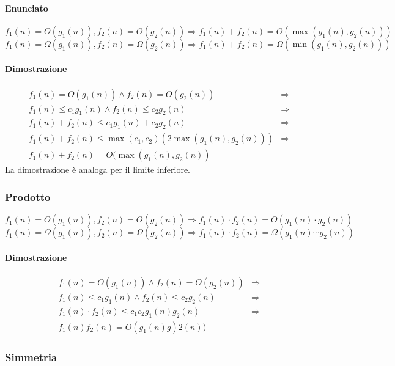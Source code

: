\paragraph{Enunciato}
\begin{equation*}
f_1(n)=O(g_1(n)), f_2(n)=O(g_2(n))\Rightarrow f_1(n)+f_2(n)=O(\max(g_1(n), g_2(n)))
\end{equation*}
\begin{equation*}
f_1(n)=\Omega(g_1(n)), f_2(n)=\Omega(g_2(n))\Rightarrow f_1(n)+f_2(n)=\Omega(\min(g_1(n), g_2(n)))
\end{equation*}
\paragraph{Dimostrazione}
\begin{align*}
f_1(n)=O(g_1(n))\land f_2(n)=O(g_2(n))&\Rightarrow\\
f_1(n)\le c_1g_1(n)\land f_2(n)\le c_2g_2(n)&\Rightarrow\\
f_1(n)+f_2(n)\le c_1g_1(n)+c_2g_2(n)&\Rightarrow\\
f_1(n)+f_2(n)\le \max(c_1, c_2)(2\max(g_1(n), g_2(n)))&\Rightarrow\\
f_1(n)+f_2(n)=O(\max(g_1(n), g_2(n))& 
\end{align*}
La dimostrazione \`e analoga per il limite inferiore.
\subsubsection{Prodotto}
\begin{equation*}
f_1(n)=O(g_1(n)), f_2(n)=O(g_2(n))\Rightarrow f_1(n)\cdot f_2(n)=O(g_1(n)\cdot g_2(n))
\end{equation*}
\begin{equation*}
f_1(n)=\Omega(g_1(n)), f_2(n)=\Omega(g_2(n))\Rightarrow f_1(n)\cdot f_2(n)=\Omega(g_1(n)\cdots g_2(n))
\end{equation*}
\paragraph{Dimostrazione}
\begin{align}
f_1(n)=O(g_1(n))\land f_2(n)=O(g_2(n))&\Rightarrow\\
f_1(n)\le c_1g_1(n)\land f_2(n)\le c_2g_2(n)&\Rightarrow\\
f_1(n)\cdot f_2(n)\le c_1c_2g_1(n)g_2(n)&\Rightarrow\\
f_1(n)f_2(n)=O(g_1(n)g)2(n))
\end{align}
\subsubsection{Simmetria}
